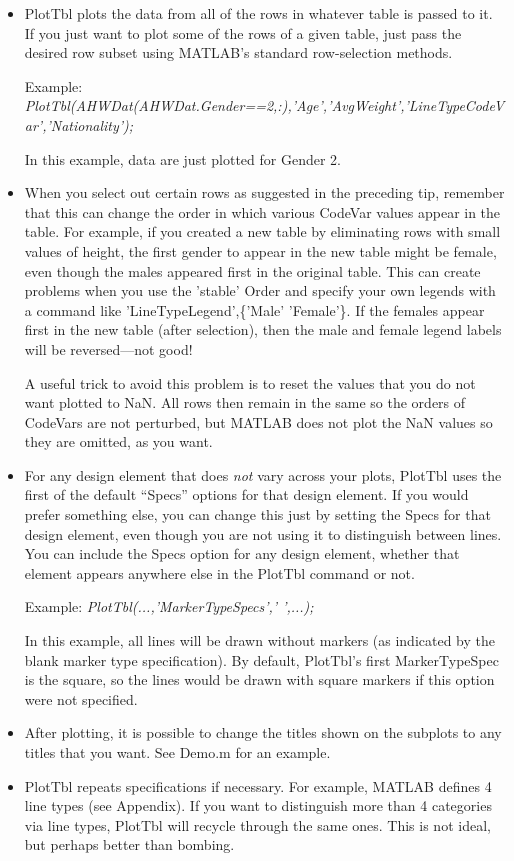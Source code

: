 \documentclass{article}
\newcommand{\example}[1]{Example: {\it #1}}
\begin{document}
\begin{itemize}

\item PlotTbl plots the data from all of the rows in whatever table is passed to it.
If you just want to plot some of the rows of a given table, just pass
the desired row subset using MATLAB's standard row-selection methods.

\example{PlotTbl(AHWDat(AHWDat.Gender==2,:),'Age','AvgWeight','LineTypeCodeVar','Nationality');} 

In this example, data are just plotted for Gender 2.

\item When you select out certain rows as suggested in the preceding tip, remember that
this can change the order in which various CodeVar values appear in the table.
For example, if you created a new table by eliminating rows with small values of height, the first gender
to appear in the new table might be female, even though the males appeared first in the original table.
This can create problems when you use the 'stable' Order and specify your own legends
with a command like 'LineTypeLegend',\{'Male' 'Female'\}.
If the females appear first in the new table (after selection), then the male and
female legend labels will be reversed---not good!

A useful trick to avoid this problem is to reset the values that you do not want plotted to NaN.
All rows then remain in the same so the orders of CodeVars are not perturbed,
but MATLAB does not plot the NaN values so they are omitted, as you want.



\item For any design element that does \emph{not} vary across your plots,
PlotTbl uses the first of the default ``Specs'' options for that design element.
If you would prefer something else, you can change this just by setting the Specs
for that design element, even though you are not using it to distinguish between lines.
You can include the Specs option for any design element, whether that element appears
anywhere else in the PlotTbl command or not.

\example{PlotTbl(...,'MarkerTypeSpecs',' ',...);} 

In this example, all lines will be drawn without markers (as indicated by the blank marker type specification).
By default, PlotTbl's first MarkerTypeSpec is the square, so the lines would be drawn with square
markers if this option were not specified.

\item After plotting, it is possible to change the titles shown on the subplots to any titles that
you want.  See Demo.m for an example.

\item PlotTbl repeats specifications if necessary.  For example, MATLAB defines 4 line types (see Appendix).
If you want to distinguish more than 4 categories via line types, PlotTbl will recycle through the same ones.
This is not ideal, but perhaps better than bombing.


\end{itemize}
\end{document}
